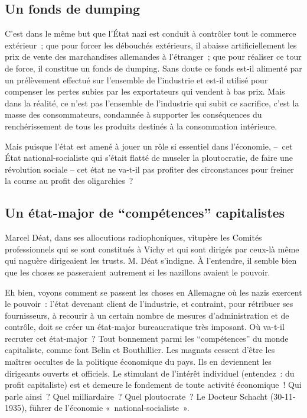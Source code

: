 \documentclass[french,twoside]{book} %
\begin{document}
\subsection[Un fonds de dumping]{Un fonds de dumping}
\noindent C’est dans le même but que l’État nazi est conduit à contrôler tout le commerce extérieur ; que pour forcer les débouchés extérieurs, il abaisse artificiellement les prix de vente des marchandises allemandes à l’étranger ; que pour réaliser ce tour de force, il constitue un fonds de dumping. Sans doute ce fonds est-il alimenté par un prélèvement effectué sur l’ensemble de l’industrie et est-il utilisé pour compenser les pertes subies par les exportateurs qui vendent à bas prix. Mais dans la réalité, ce n’est pas l’ensemble de l’industrie qui subit ce sacrifice, c’est la masse des consommateurs, condamnée à supporter les conséquences du renchérissement de tous les produits destinés à la consommation intérieure.\par
Mais puisque l’état est amené à jouer un rôle si essentiel dans l’économie, – cet État national-socialiste qui s’était flatté de museler la ploutocratie, de faire une révolution sociale – cet état ne va-t-il pas profiter des circonstances pour freiner la course au profit des oligarchies ?
\subsection[Un état-major de “compétences” capitalistes]{Un état-major de “compétences” capitalistes}
\noindent Marcel Déat, dans ses allocutions radiophoniques, vitupère les Comités professionnels qui se sont constitués à Vichy et qui sont dirigés par ceux-là même qui naguère dirigeaient les trusts. M. Déat s’indigne. À l’entendre, il semble bien que les choses se passeraient autrement si les nazillons avaient le pouvoir.\par
Eh bien, voyons comment se passent les choses en Allemagne où les nazis exercent le pouvoir : l’état devenant client de l’industrie, et contraint, pour rétribuer ses fournisseurs, à recourir à un certain nombre de mesures d’administration et de contrôle, doit se créer un état-major bureaucratique très imposant. Où va-t-il recruter cet état-major ? Tout bonnement parmi les “compétences” du monde capitaliste, comme font Belin et Bouthillier. Les magnats cessent d’être les maîtres occultes de la politique économique du pays. Ils en deviennent les dirigeants ouverts et officiels. Le stimulant de l’intérêt individuel (entendez : du profit capitaliste) est et demeure le fondement de toute activité économique ! Qui parle ainsi ? Quel milliardaire ? Quel ploutocrate ? Le Docteur Schacht (30-11-1935), führer de l’économie « national-socialiste ».
\end{document}
